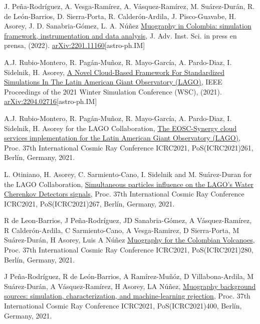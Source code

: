 \begin{etaremune}
\item {} J. Peña-Rodríguez, A. Vesga-Ramírez, A. Vásquez-Ramírez, M. Suárez-Durán, R. de León-Barrios, D. Sierra-Porta, R. Calderón-Ardila, J. Pisco-Guavabe, H. Asorey, J. D. Sanabria-Gómez, L. A. Núñez \href{}{Muography in Colombia: simulation framework, instrumentation and data analysis}, J. Adv. Inst. Sci. \ifeng in press \else en prensa\fi, (2022). \href{ http://arxiv.org/abs/2201.11160}{arXiv:2201.11160}[astro-ph.IM]

\item {} A.J. Rubio-Montero, R. Pagán-Muñoz, R. Mayo-García, A. Pardo-Diaz, I. Sidelnik, H. Asorey, \href{https://doi.org/10.1109/WSC52266.2021.9715360}{A Novel Cloud-Based Framework For Standardized Simulations In The Latin American Giant Observatory (LAGO)}, \en IEEE Proceedings of the 2021 Winter Simulation Conference (WSC), (2021). \href{http://arxiv.org/abs/2204.02716}{arXiv:2204.02716}[astro-ph.IM]

\item {} A.J. Rubio-Montero, R. Pagán-Muñoz, R. Mayo-García, A. Pardo-Diaz, I. Sidelnik, H. Asorey for the LAGO Collaboration, \href{https://doi.org/10.22323/1.395.0261}{The EOSC-Synergy cloud services implementation for the Latin American Giant Observatory (LAGO)}, \en Proc. 37th International Cosmic Ray Conference ICRC2021, PoS(ICRC2021)261, Berlín, Germany, 2021.

\item {} L. Otiniano, H. Asorey, C. Sarmiento-Cano, I. Sidelnik and M. Suárez-Duran for the LAGO Collaboration, \href{https://doi.org/10.22323/1.395.0267}{Simultaneous particles influence on the LAGO’s Water Cherenkov Detectors signals}, \en Proc. 37th International Cosmic Ray Conference ICRC2021, PoS(ICRC2021)267, Berlín, Germany, 2021.

\item {} R de Leon-Barrios, J Peña-Rodríguez, JD Sanabria-Gómez, A Vásquez-Ramírez, R Calderón-Ardila, C Sarmiento-Cano, A Vesga-Ramirez, D Sierra-Porta, M Suárez-Durán, H Asorey, Luis A Núñez \href{https://doi.org/10.22323/1.395.0280}{Muography for the Colombian Volcanoes}, \en Proc. 37th International Cosmic Ray Conference ICRC2021, PoS(ICRC2021)280, Berlín, Germany, 2021.

\item {} J Peña-Rodríguez, R de León-Barrios, A Ramírez-Muñóz, D Villabona-Ardila, M Suárez-Durán, A Vásquez-Ramírez, H Asorey, LA Núñez, \href{https://doi.org/10.22323/1.395.0400}{Muography background sources: simulation, characterization, and machine-learning rejection}, \en Proc. 37th International Cosmic Ray Conference ICRC2021, PoS(ICRC2021)400, Berlín, Germany, 2021.


\end{etaremune}
